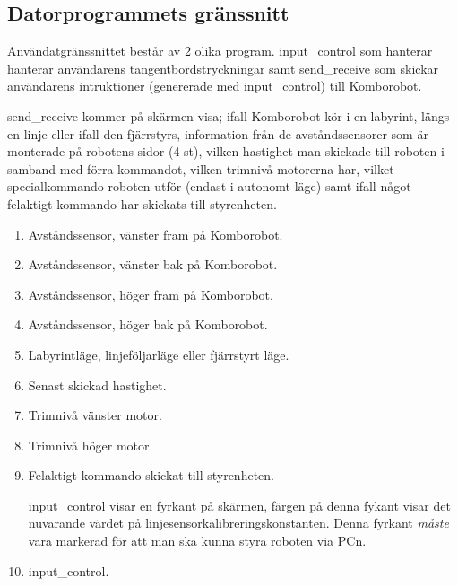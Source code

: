 
\subsection{Datorprogrammets gränssnitt}

Användatgränssnittet består av 2 olika program. input\_control som hanterar
hanterar användarens tangentbordstryckningar samt send\_receive som skickar
användarens intruktioner (genererade med input\_control) till Komborobot.


send\_receive kommer på skärmen visa; ifall Komborobot kör i en labyrint, längs en linje eller ifall
den fjärrstyrs, information från de avståndssensorer som är monterade på
robotens sidor (4 st), vilken hastighet man skickade till roboten i samband med
förra kommandot, vilken trimnivå motorerna har, vilket specialkommando roboten
utför (endast i autonomt läge) samt ifall något felaktigt kommando har skickats
till styrenheten.

\begin{enumerate}
\item Avståndssensor, vänster fram på Komborobot.
\item Avståndssensor, vänster bak på Komborobot.
\item Avståndssensor, höger fram på Komborobot.
\item Avståndssensor, höger bak på Komborobot.
\item Labyrintläge, linjeföljarläge eller fjärrstyrt läge.
\item Senast skickad hastighet.
\item Trimnivå vänster motor.
\item Trimnivå höger motor.
\item Felaktigt kommando skickat till styrenheten.

input\_control visar en fyrkant på skärmen, färgen på denna fykant visar det
nuvarande värdet på linjesensorkalibreringskonstanten. Denna fyrkant
\emph{måste} vara markerad för att man ska kunna styra roboten via PCn.

\item input\_control.

\end{enumerate}

